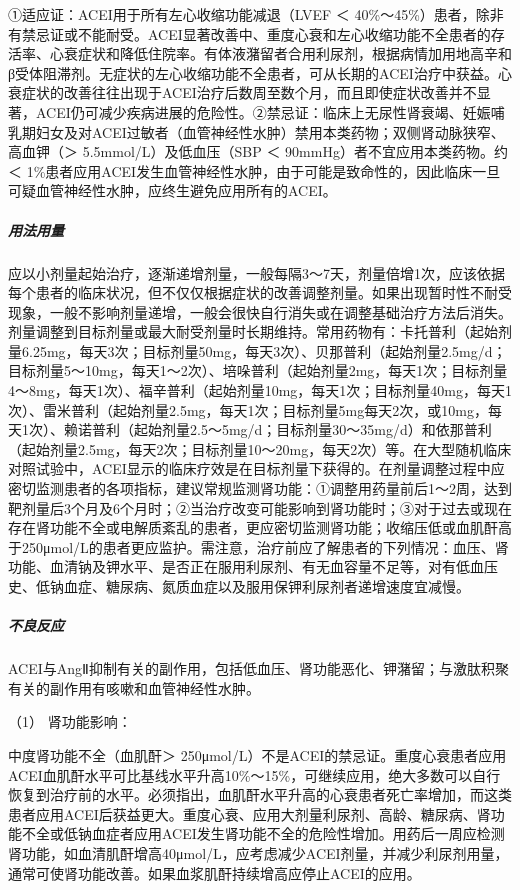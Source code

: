 ①适应证：ACEI用于所有左心收缩功能减退（LVEF ＜
40\%～45\%）患者，除非有禁忌证或不能耐受。ACEI显著改善中、重度心衰和左心收缩功能不全患者的存活率、心衰症状和降低住院率。有体液潴留者合用利尿剂，根据病情加用地高辛和β受体阻滞剂。无症状的左心收缩功能不全患者，可从长期的ACEI治疗中获益。心衰症状的改善往往出现于ACEI治疗后数周至数个月，而且即使症状改善并不显著，ACEI仍可减少疾病进展的危险性。②禁忌证：临床上无尿性肾衰竭、妊娠哺乳期妇女及对ACEI过敏者（血管神经性水肿）禁用本类药物；双侧肾动脉狭窄、高血钾（＞
5.5mmol/L）及低血压（SBP ＜ 90mmHg）者不宜应用本类药物。约＜
1\%患者应用ACEI发生血管神经性水肿，由于可能是致命性的，因此临床一旦可疑血管神经性水肿，应终生避免应用所有的ACEI。

\subparagraph{用法用量}

应以小剂量起始治疗，逐渐递增剂量，一般每隔3～7天，剂量倍增1次，应该依据每个患者的临床状况，但不仅仅根据症状的改善调整剂量。如果出现暂时性不耐受现象，一般不影响剂量递增，一般会很快自行消失或在调整基础治疗方法后消失。剂量调整到目标剂量或最大耐受剂量时长期维持。常用药物有：卡托普利（起始剂量6.25mg，每天3次；目标剂量50mg，每天3次）、贝那普利（起始剂量2.5mg/d；目标剂量5～10mg，每天1～2次）、培哚普利（起始剂量2mg，每天1次；目标剂量4～8mg，每天1次）、福辛普利（起始剂量10mg，每天1次；目标剂量40mg，每天1次）、雷米普利（起始剂量2.5mg，每天1次；目标剂量5mg每天2次，或10mg，每天1次）、赖诺普利（起始剂量2.5～5mg/d；目标剂量30～35mg/d）和依那普利（起始剂量2.5mg，每天2次；目标剂量10～20mg，每天2次）等。在大型随机临床对照试验中，ACEI显示的临床疗效是在目标剂量下获得的。在剂量调整过程中应密切监测患者的各项指标，建议常规监测肾功能：①调整用药量前后1～2周，达到靶剂量后3个月及6个月时；②当治疗改变可能影响到肾功能时；③对于过去或现在存在肾功能不全或电解质紊乱的患者，更应密切监测肾功能；收缩压低或血肌酐高于250μmol/L的患者更应监护。需注意，治疗前应了解患者的下列情况：血压、肾功能、血清钠及钾水平、是否正在服用利尿剂、有无血容量不足等，对有低血压史、低钠血症、糖尿病、氮质血症以及服用保钾利尿剂者递增速度宜减慢。

\subparagraph{不良反应}

ACEI与AngⅡ抑制有关的副作用，包括低血压、肾功能恶化、钾潴留；与激肽积聚有关的副作用有咳嗽和血管神经性水肿。

\hypertarget{text00074.htmlux5cux23CHP3-3-3-2-2-4-1}{}
（1） 肾功能影响：

中度肾功能不全（血肌酐＞
250μmol/L）不是ACEI的禁忌证。重度心衰患者应用ACEI血肌酐水平可比基线水平升高10\%～15\%，可继续应用，绝大多数可以自行恢复到治疗前的水平。必须指出，血肌酐水平升高的心衰患者死亡率增加，而这类患者应用ACEI后获益更大。重度心衰、应用大剂量利尿剂、高龄、糖尿病、肾功能不全或低钠血症者应用ACEI发生肾功能不全的危险性增加。用药后一周应检测肾功能，如血清肌酐增高40μmol/L，应考虑减少ACEI剂量，并减少利尿剂用量，通常可使肾功能改善。如果血浆肌酐持续增高应停止ACEI的应用。

